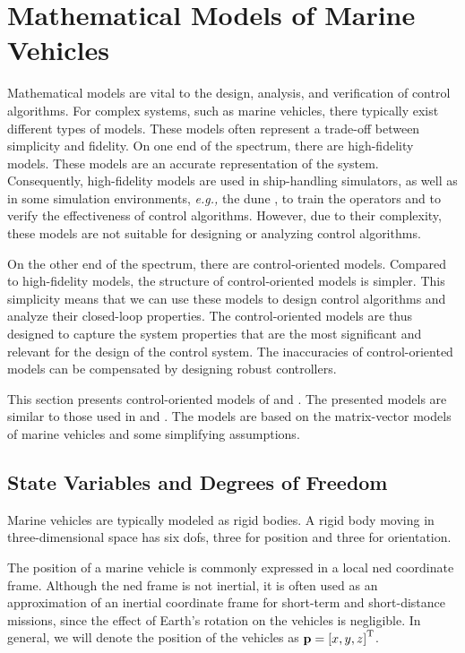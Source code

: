 \section{Mathematical Models of Marine Vehicles}
\label{sec:model}

Mathematical models are vital to the design, analysis, and verification of control algorithms.
For complex systems, such as marine vehicles, there typically exist different types of models.
These models often represent a trade-off between simplicity and fidelity.
On one end of the spectrum, there are high-fidelity models.
These models are an accurate representation of the system.
Consequently, high-fidelity models are used in ship-handling simulators, as well as in some simulation environments, \emph{e.g.,} the \gls{dune} \cite{dune}, to train the operators and to verify the effectiveness of control algorithms.
However, due to their complexity, these models are not suitable for designing or analyzing control algorithms.

On the other end of the spectrum, there are control-oriented models.
Compared to high-fidelity models, the structure of control-oriented models is simpler.
This simplicity means that we can use these models to design control algorithms and analyze their closed-loop properties.
The control-oriented models are thus designed to capture the system properties that are the most significant and relevant for the design of the control system.
The inaccuracies of control-oriented models can be compensated by designing robust controllers.

This section presents control-oriented models of  and .
The presented models are similar to those used in \cite{borhaug_straight_2007} and \cite{fredriksen_global_2006}.
The models are based on the matrix-vector models of marine vehicles \cite{fossen_handbook_2011} and some simplifying assumptions.

\subsection{State Variables and Degrees of Freedom}
Marine vehicles are typically modeled as rigid bodies.
A rigid body moving in three-dimensional space has six \glspl{dof}, three for position and three for orientation.

The position of a marine vehicle is commonly expressed in a local \gls{ned} coordinate frame.
Although the \gls{ned} frame is not inertial, it is often used as an approximation of an inertial coordinate frame for short-term and short-distance missions, since the effect of Earth's rotation on the vehicles is negligible.
In general, we will denote the position of the vehicles as $\mathbf{p} = \left[x, y, z\right]^{\mathrm{T}}$.

